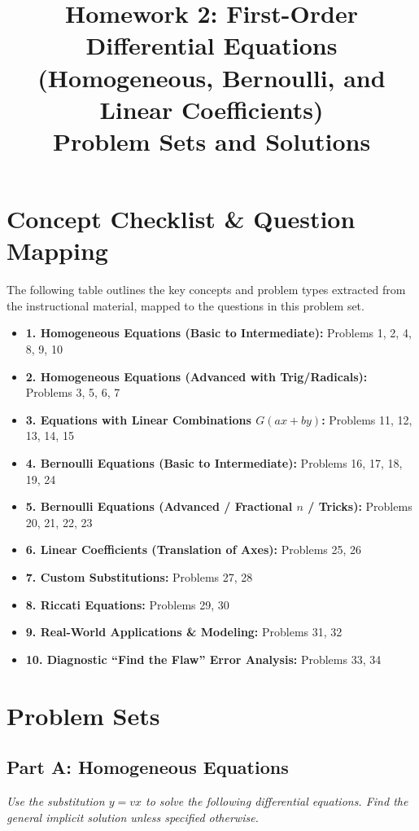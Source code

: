 \documentclass[12pt]{article}
\title{Homework 2: First-Order Differential Equations \\ (Homogeneous, Bernoulli, and Linear Coefficients) \\ \large Problem Sets and Solutions}
\author{}
\date{}
\begin{document}
\maketitle
\tableofcontents
\newpage

\section{Concept Checklist \& Question Mapping}
The following table outlines the key concepts and problem types extracted from the instructional material, mapped to the questions in this problem set.

\begin{itemize}
    \item \textbf{1. Homogeneous Equations (Basic to Intermediate):} Problems 1, 2, 4, 8, 9, 10
    \item \textbf{2. Homogeneous Equations (Advanced with Trig/Radicals):} Problems 3, 5, 6, 7
    \item \textbf{3. Equations with Linear Combinations $G(ax+by)$:} Problems 11, 12, 13, 14, 15
    \item \textbf{4. Bernoulli Equations (Basic to Intermediate):} Problems 16, 17, 18, 19, 24
    \item \textbf{5. Bernoulli Equations (Advanced / Fractional $n$ / Tricks):} Problems 20, 21, 22, 23
    \item \textbf{6. Linear Coefficients (Translation of Axes):} Problems 25, 26
    \item \textbf{7. Custom Substitutions:} Problems 27, 28
    \item \textbf{8. Riccati Equations:} Problems 29, 30
    \item \textbf{9. Real-World Applications \& Modeling:} Problems 31, 32
    \item \textbf{10. Diagnostic ``Find the Flaw'' Error Analysis:} Problems 33, 34
\end{itemize}

\newpage

\section{Problem Sets}

\subsection*{Part A: Homogeneous Equations}
\textit{Use the substitution $y = vx$ to solve the following differential equations. Find the general implicit solution unless specified otherwise.}
\end{document}
